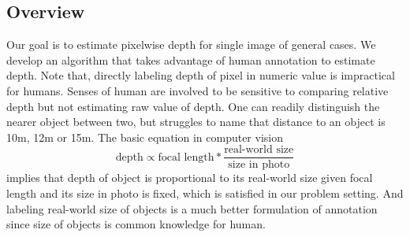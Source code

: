 \documentclass[10pt,twocolumn,letterpaper]{article}
\begin{document}
\subsection{Overview}
Our goal is to estimate pixelwise depth for single image of general cases. We develop an algorithm that takes advantage of human annotation to estimate depth. Note that, directly labeling depth of pixel in numeric value is impractical for humans. Senses of human are involved to be sensitive to comparing relative depth but not estimating raw value of depth. One can readily distinguish the nearer object between two, but struggles to name that distance to an object is 10m, 12m or 15m. The basic equation in computer vision
\begin{equation}
\text{depth} \propto \text{focal\ length} * \frac{\text{real-world\ size}} {\text{size\ in\ photo}}
\end{equation}
implies that depth of object is proportional to its real-world size given focal length and its size in photo is fixed, which is satisfied in our problem setting. And labeling real-world size of objects is a much better formulation of annotation since size of objects is common knowledge for human.
\end{document}
